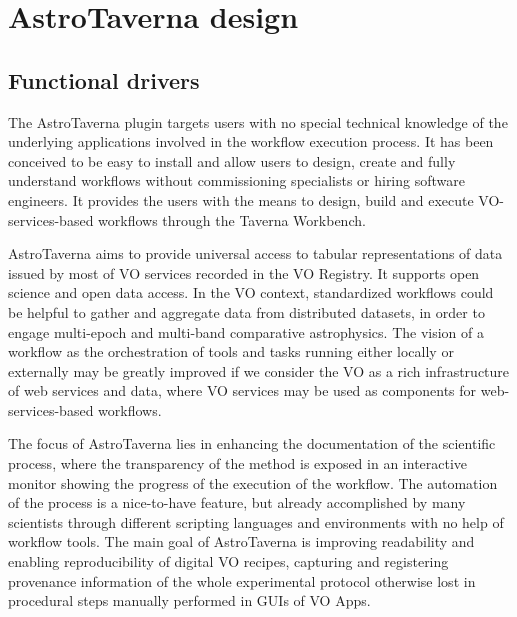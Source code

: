 \documentclass[final,authoryear,5p,times,twocolumn]{elsarticle}
\begin{document}
\section{AstroTaverna design}
\label{Design}

\subsection{Functional drivers}
\label{FunctionalDrivers}

The AstroTaverna plugin targets users with no special technical knowledge of the underlying applications involved in the workflow execution process. It has been conceived to be easy to install and allow users to design, create and fully understand workflows without commissioning specialists or hiring software engineers. It provides the users with the means to design, build and execute VO-services-based workflows through the Taverna Workbench.

AstroTaverna aims to provide universal access to tabular representations of data issued by most of VO services recorded in the VO Registry. It supports open science and open data access. In the VO context, standardized workflows could be helpful to gather and aggregate data from distributed datasets, in order to engage multi-epoch and multi-band comparative astrophysics. The vision of a workflow as the orchestration of tools and tasks running either locally or externally may be greatly improved if we consider the VO as a rich infrastructure of web services and data, where VO services may be used as components for web-services-based workflows. 

The focus of AstroTaverna lies in enhancing the documentation of the scientific process, where the transparency of the method is exposed in an interactive monitor showing the progress of the execution of the workflow. The automation of the process is a nice-to-have feature, but already accomplished by many scientists through different scripting languages and environments with no help of workflow tools. The main goal of AstroTaverna is improving readability and enabling reproducibility of digital VO recipes, capturing and registering provenance information of the whole experimental protocol otherwise lost in procedural steps manually performed in GUIs of VO Apps. 
\end{document}
